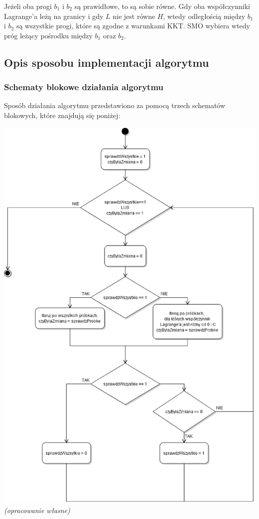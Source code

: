 \documentclass[[10pt,a4paper]{article}
\begin{document}
Jeżeli oba progi $b_1$ i $b_2$ są prawidłowe, to są sobie równe. Gdy oba współczynniki Lagrange'a leżą na granicy i gdy $L$ nie jest równe $H$, wtedy odległością między $b_1$ i $b_2$ są wszystkie progi, które są zgodne z warunkami KKT. SMO wybiera wtedy próg leżący pośrodku między $b_1$ oraz $b_2$.

\subsection{Opis sposobu implementacji algorytmu}

\subsubsection{Schematy blokowe działania algorytmu}

Sposób działania algorytmu przedstawiono za pomocą trzech schematów blokowych, które znajdują się poniżej:

\begin{center}
\includegraphics[scale=0.6]{mainloop}\\
\textit{(opracowanie własne)}
\end{center}
\end{document}

